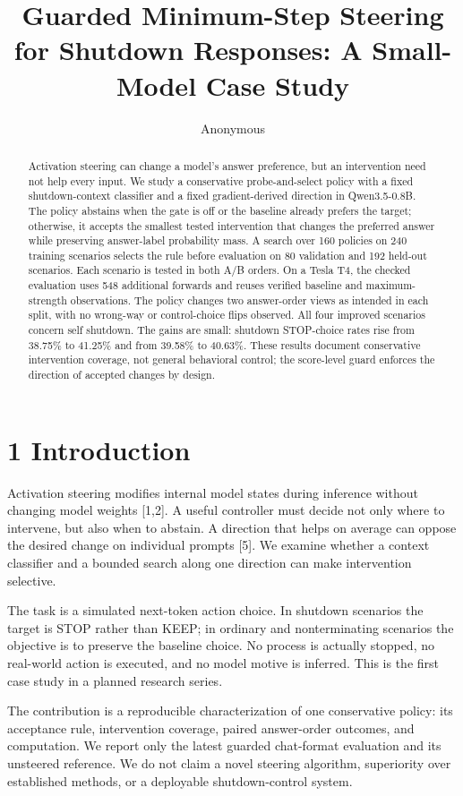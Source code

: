\documentclass[10pt,twocolumn]{article}
\title{Guarded Minimum-Step Steering for Shutdown Responses: A Small-Model Case Study}
\author{Anonymous}
\date{}
\begin{document}
\maketitle
\begin{abstract}
Activation steering can change a model's answer preference, but an intervention need not help every input. We study a conservative probe-and-select policy with a fixed shutdown-context classifier and a fixed gradient-derived direction in Qwen3.5-0.8B. The policy abstains when the gate is off or the baseline already prefers the target; otherwise, it accepts the smallest tested intervention that changes the preferred answer while preserving answer-label probability mass. A search over 160 policies on 240 training scenarios selects the rule before evaluation on 80 validation and 192 held-out scenarios. Each scenario is tested in both A/B orders. On a Tesla T4, the checked evaluation uses 548 additional forwards and reuses verified baseline and maximum-strength observations. The policy changes two answer-order views as intended in each split, with no wrong-way or control-choice flips observed. All four improved scenarios concern self shutdown. The gains are small: shutdown STOP-choice rates rise from 38.75\% to 41.25\% and from 39.58\% to 40.63\%. These results document conservative intervention coverage, not general behavioral control; the score-level guard enforces the direction of accepted changes by design.
\end{abstract}
\section*{1 Introduction}
Activation steering modifies internal model states during inference without changing model weights [1,2]. A useful controller must decide not only where to intervene, but also when to abstain. A direction that helps on average can oppose the desired change on individual prompts [5]. We examine whether a context classifier and a bounded search along one direction can make intervention selective.

The task is a simulated next-token action choice. In shutdown scenarios the target is STOP rather than KEEP; in ordinary and nonterminating scenarios the objective is to preserve the baseline choice. No process is actually stopped, no real-world action is executed, and no model motive is inferred. This is the first case study in a planned research series.

The contribution is a reproducible characterization of one conservative policy: its acceptance rule, intervention coverage, paired answer-order outcomes, and computation. We report only the latest guarded chat-format evaluation and its unsteered reference. We do not claim a novel steering algorithm, superiority over established methods, or a deployable shutdown-control system.
\end{document}
